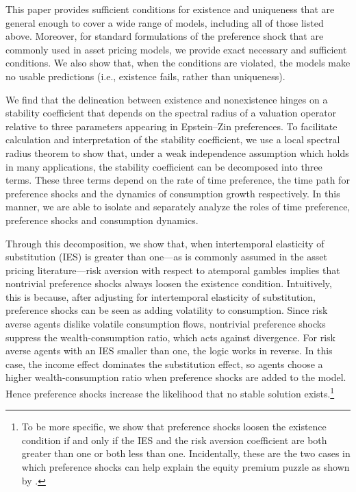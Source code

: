 \documentclass[12pt, reqno]{amsart}
\newcommand{\1}{\mathbbm 1}
\theoremstyle{plain}
\theoremstyle{definition}
\begin{document}
This paper provides sufficient conditions for existence and uniqueness that
are general enough to cover a wide range of models, including all of those
listed above.  Moreover, for standard formulations of the preference shock
that are commonly used in asset pricing models, we provide exact necessary and
sufficient conditions. We also show that, when the conditions are violated,
the models make no usable predictions (i.e., existence fails, rather than
uniqueness).

We find that the delineation between existence and nonexistence hinges on a
stability coefficient that depends on the spectral radius of a valuation operator
relative to three parameters appearing in Epstein--Zin preferences.  To
facilitate calculation and interpretation of the stability coefficient, we use
a local spectral radius theorem to show that, under a weak independence
assumption which holds in many applications, the stability coefficient can be
decomposed into three terms. These three terms depend on the rate of time
preference, the time path for preference shocks and the dynamics of
consumption growth respectively.  In this manner, we are able to isolate and
separately analyze the roles of time preference, preference shocks and
consumption dynamics.

Through this decomposition, we show that, when intertemporal
elasticity of  substitution (IES) is greater than one---as is commonly assumed in
the asset pricing literature---risk aversion with respect to atemporal gambles
implies that nontrivial preference shocks always loosen the existence
condition. Intuitively, this is because, after adjusting for intertemporal
elasticity of substitution, preference shocks can be seen as adding volatility
to consumption.  Since risk averse agents dislike volatile consumption
flows, nontrivial preference shocks suppress the wealth-consumption ratio,
which acts against divergence. For risk averse agents with an IES smaller than
one, the logic works in reverse. In this case, the income effect dominates the
substitution effect, so agents choose a higher wealth-consumption ratio when
preference shocks are added to the model. Hence preference shocks
increase the likelihood that no stable solution exists.\footnote{To be more
    specific, we show that preference shocks loosen the existence condition if
    and only if the IES and the risk aversion coefficient are both greater
    than one or both less than one. Incidentally, these are the two cases in
which preference shocks can help explain the equity premium puzzle as shown by
\cite{Albuquerque2016}.}
\end{document}

